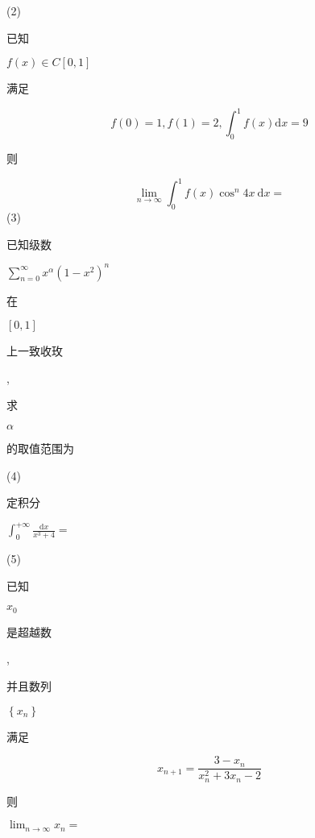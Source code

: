 \documentclass[10pt]{article}
\begin{document}
(2) \begin{CJK}{UTF8}{mj}已知\end{CJK} $f(x) \in C[0,1]$ \begin{CJK}{UTF8}{mj}满足\end{CJK}
$$
f(0)=1, f(1)=2, \int_{0}^{1} f(x) \mathrm{d} x=9
$$
\begin{CJK}{UTF8}{mj}则\end{CJK}
$$
\lim _{n \rightarrow \infty} \int_{0}^{1} f(x) \cos ^{n} 4 x \mathrm{~d} x=
$$
(3) \begin{CJK}{UTF8}{mj}已知级数\end{CJK} $\sum_{n=0}^{\infty} x^{\alpha}\left(1-x^{2}\right)^{n}$ \begin{CJK}{UTF8}{mj}在\end{CJK} $[0,1]$ \begin{CJK}{UTF8}{mj}上一致收玫\end{CJK}, \begin{CJK}{UTF8}{mj}求\end{CJK} $\alpha$ \begin{CJK}{UTF8}{mj}的取值范围为\end{CJK}

(4) \begin{CJK}{UTF8}{mj}定积分\end{CJK} $\int_{0}^{+\infty} \frac{\mathrm{d} x}{x^{3}+4}=$

(5) \begin{CJK}{UTF8}{mj}已知\end{CJK} $x_{0}$ \begin{CJK}{UTF8}{mj}是超越数\end{CJK}, \begin{CJK}{UTF8}{mj}并且数列\end{CJK} $\left\{x_{n}\right\}$ \begin{CJK}{UTF8}{mj}满足\end{CJK}
$$
x_{n+1}=\frac{3-x_{n}}{x_{n}^{2}+3 x_{n}-2}
$$
\begin{CJK}{UTF8}{mj}则\end{CJK} $\lim _{n \rightarrow \infty} x_{n}=$
\end{document}

